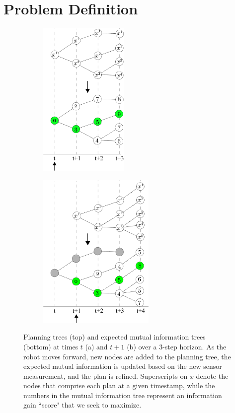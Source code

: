 \section{Problem Definition}

\begin{figure}[t]
  \centering
  \begin{subfigure}[b]{0.3\textwidth}
    \label{fig:plan_at_t0}
    \includegraphics[height=3in]{plan_at_t0}
    \caption{}
  \end{subfigure}
  \hspace{1in}
  \begin{subfigure}[b]{0.3\textwidth}
    \label{fig:plan_at_t1}
    \includegraphics[height=3in]{plan_at_t1}
    \caption{}
  \end{subfigure}
  \caption{ \small Planning trees (top) and expected mutual information trees (bottom) at times $t$ (a) and $t+1$ (b) over a 3-step horizon. As the robot moves forward, new nodes are added to the planning tree, the expected mutual information is updated based on the new sensor measurement, and the plan is refined. Superscripts on $x$ denote the nodes that comprise each plan at a given timestamp, while the numbers in the mutual information tree represent an information gain ``score" that we seek to maximize. \label{fig:plan}}
\end{figure}
